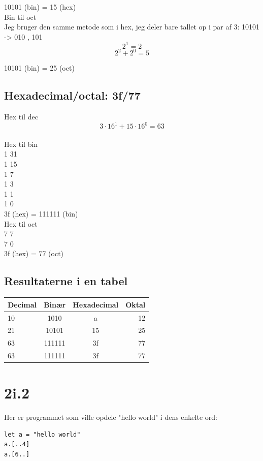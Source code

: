 \documentclass[12pt, a4paper, hidelinks]{article}
\begin{document}
10101 (bin) = 15 (hex) \\

Bin til oct \\
Jeg bruger den samme metode som i hex, jeg deler bare tallet op i par af 3: 10101 -> 010 , 101
\[  2^1 = 2   \]
\[ 2^2 + 2^0 =  5 \] 

10101 (bin) = 25 (oct) \\

\subsection{Hexadecimal/octal: 3f/77}
Hex til dec
\[ 3 \cdot 16^1 + 15 \cdot 16^0  = 63\]
\\
Hex til bin\\

1 31 \\
1 15 \\
1 7 \\
1 3 \\
1 1 \\
1 0 \\

3f (hex) = 111111 (bin)\\

Hex til oct \\
7 7 \\
7 0 \\

3f (hex) = 77 (oct) \\

\subsection{Resultaterne i en tabel}

\begin{tabular}{| l | c | c | r |}  
\hline
Decimal & Binær  & Hexadecimal & Oktal \\ \hline
10 & 1010 & a & 12 \\ \hline
21 & 10101 & 15 & 25  \\ \hline
63 & 111111  & 3f & 77 \\ \hline
63 & 111111  & 3f & 77 \\ \hline
\end{tabular}


\section{2i.2}
Her er programmet som ville opdele "hello world" i dens enkelte ord:
\begin{lstlisting}
let a = "hello world"
a.[..4]
a.[6..]

\end{lstlisting}







\end{document}

